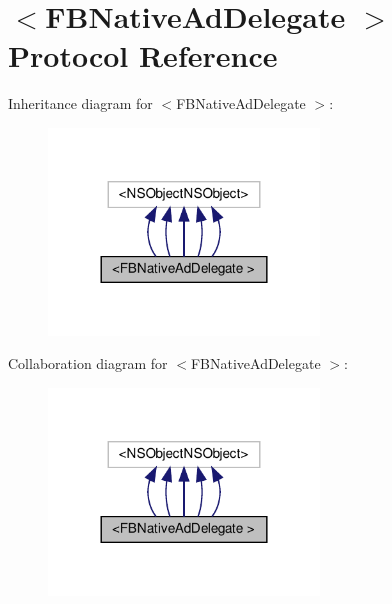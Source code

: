 \hypertarget{protocolFBNativeAdDelegate_01-p}{}\section{$<$F\+B\+Native\+Ad\+Delegate $>$ Protocol Reference}
\label{protocolFBNativeAdDelegate_01-p}


Inheritance diagram for $<$F\+B\+Native\+Ad\+Delegate $>$\+:
\nopagebreak
\begin{figure}[H]
\begin{center}
\leavevmode
\includegraphics[width=204pt]{protocolFBNativeAdDelegate_01-p__inherit__graph}
\end{center}
\end{figure}


Collaboration diagram for $<$F\+B\+Native\+Ad\+Delegate $>$\+:
\nopagebreak
\begin{figure}[H]
\begin{center}
\leavevmode
\includegraphics[width=204pt]{protocolFBNativeAdDelegate_01-p__coll__graph}
\end{center}
\end{figure}
